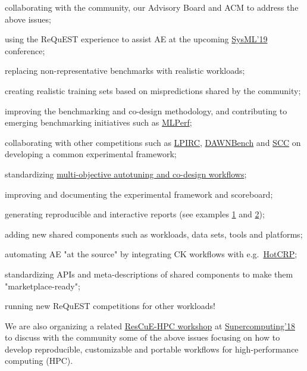 \documentclass[10pt,onecolumn]{article}
\newenvironment{packed_itemize}{
\begin{itemize}
  \setlength{\itemsep}{1pt}
  \setlength{\parskip}{0pt}
  \setlength{\parsep}{0pt}
}{\end{itemize}}
\begin{document}
\begin{packed_itemize}

\item collaborating with the community, our Advisory Board and ACM to address the above issues;
\item using the ReQuEST experience to assist AE at the upcoming \href{http://sysml.cc}{SysML'19} conference;
\item replacing non-representative benchmarks with realistic workloads;
\item creating realistic training sets based on mispredictions shared by the community;
\item improving the benchmarking and co-design methodology, and contributing to emerging benchmarking initiatives such as \href{http://mlperf.org}{MLPerf};
\item collaborating with other competitions such as \href{https://rebootingcomputing.ieee.org/lpirc}{LPIRC}, \href{https://dawn.cs.stanford.edu/benchmark}{DAWNBench} and \href{https://sc18.supercomputing.org/experience/studentssc/student-cluster-competition}{SCC} on developing a common experimental framework;
\item standardizing \href{http://cKnowledge.org/rpi-crowd-tuning}{multi-objective autotuning and co-design workflows};
\item improving and documenting the experimental framework and scoreboard;
\item generating reproducible and interactive reports (see examples \href{http://cknowledge.org/repo/web.php?wcid=report:request-overview}{1} and \href{http://cKnowledge.org/rpi-crowd-tuning}{2});
\item adding new shared components such as workloads, data sets, tools and platforms;
\item automating AE "at the source" by integrating CK workflows with e.g.\ \href{https://hotcrp.com/}{HotCRP};
\item standardizing APIs and meta-descriptions of shared components to make them "marketplace-ready";
\item running new ReQuEST competitions for other workloads!

\end{packed_itemize}

We are also organizing a related \href{http://rescue-hpc.org}{ResCuE-HPC workshop}
at \href{https://sc18.supercomputing.org/}{Supercomputing'18} to discuss with the community some of the
above issues focusing on how to develop reproducible,
customizable and portable workflows for high-performance
computing (HPC).
\end{document}
